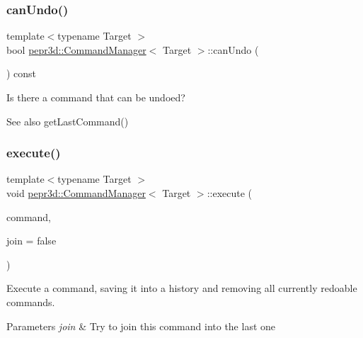 \subsubsection{\texorpdfstring{canUndo()}{canUndo()}}
{\footnotesize\ttfamily template$<$typename Target $>$ \\
bool \mbox{\hyperlink{classpepr3d_1_1_command_manager}{pepr3d\+::\+Command\+Manager}}$<$ Target $>$\+::can\+Undo (\begin{DoxyParamCaption}{ }\end{DoxyParamCaption}) const}



Is there a command that can be undoed? 

\begin{DoxySeeAlso}{See also}
get\+Last\+Command() 
\end{DoxySeeAlso}
\mbox{\label{classpepr3d_1_1_command_manager_a0aae9681640f09da9c908154b805273e}} 
\subsubsection{\texorpdfstring{execute()}{execute()}}
{\footnotesize\ttfamily template$<$typename Target $>$ \\
void \mbox{\hyperlink{classpepr3d_1_1_command_manager}{pepr3d\+::\+Command\+Manager}}$<$ Target $>$\+::execute (\begin{DoxyParamCaption}\item[{std\+::unique\+\_\+ptr$<$ \mbox{\hyperlink{classpepr3d_1_1_command_base}{Command\+Base\+Type}} $>$ \&\&}]{command,  }\item[{bool}]{join = {\ttfamily false} }\end{DoxyParamCaption})}



Execute a command, saving it into a history and removing all currently redoable commands. 


\begin{DoxyParams}{Parameters}
{\em join} & Try to join this command into the last one \\
\hline
\end{DoxyParams}
\mbox{\label{classpepr3d_1_1_command_manager_a1dc9b90a3f5a6f14502999187a9d45ef}} 
